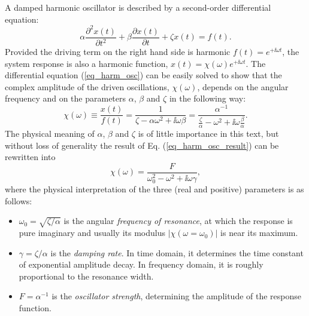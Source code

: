 A damped harmonic oscillator is described by a second-order differential equation:
\begin{equation} \alpha \frac{\partial^{2} x(t)}{\partial t^{2}} + \beta\frac{\partial x(t)}{\partial t} + \zeta x(t) = f(t). \label{eq_harm_osc}\end{equation}
Provided the driving term on the right hand side  is harmonic $f(t) = e^{+\ii \omega t}$, the system response is also a harmonic function, $x(t) = \chi(\omega) e^{+\ii \omega t}$. The differential equation (\ref{eq_harm_osc}) can be easily solved to show that the complex amplitude of the driven oscillations, $\chi(\omega)$, depends on the angular frequency and on the parameters $\alpha$, $\beta$ and $\zeta$ in the following way:
\begin{equation} \chi(\omega) \equiv \frac{x(t)}{f(t)} = \frac{1}{\zeta-\alpha\omega^{2} + \ii\omega\beta}  = \frac{\alpha^{-1}}{\frac{\zeta}{\alpha}-\omega^{2} + \ii\omega\frac{\beta}{\alpha}}. \label{eq_harm_osc_result}\end{equation}
The physical meaning of $\alpha$, $\beta$ and $\zeta$ is of little importance in this text, but without loss of generality the result of Eq. (\ref{eq_harm_osc_result}) can be rewritten into
\begin{equation} \chi(\omega) = \frac{F}{\omega_0^{2}-\omega^{2} + \ii\omega\gamma}, \label{eq_harm_osc_rewritten}\end{equation}
where the physical interpretation of the three (real and positive) parameters is as follows:
\begin{itemize}
 \item{$\omega_0 = \sqrt{\zeta/\alpha}$ is the angular \textit{frequency of resonance}, at which the response is pure imaginary and usually its modulus $|\chi(\omega=\omega_0)|$ is near its maximum.} 
 \item{$\gamma = \zeta/\alpha$ is the \textit{damping rate}. In time domain, it determines the time constant of exponential amplitude decay. In frequency domain, it is roughly proportional to the resonance width. } 
 \item{$F = \alpha^{-1}$ is the \textit{oscillator strength}, determining the amplitude of the response function.}
 \end{itemize}


